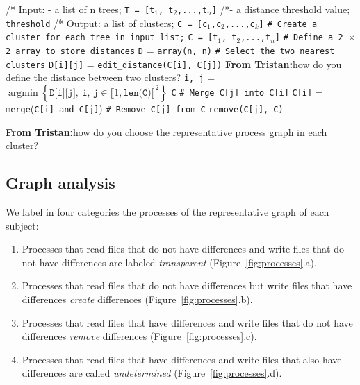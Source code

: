 \documentclass[a4paper,num-refs]{oup-contemporary}
\DeclareMathOperator*{\argmin}{argmin}
\newcommand{\tristan}[1]{\color{blue}\textbf{From Tristan:}#1\color{black}}
\begin{document}
\begin{algorithm}[h!]
\caption{Hierarchical clustering algorithm from SciPy}
\label{algo:hclustering}
\begin{algorithmic}

  \State /* Input: - a list of n trees; \texttt{T = [t${_1}$, t${_2}$,...,t${_n}$]}
  \State /*\quad \quad \quad \quad - a distance threshold value; \texttt{threshold}
  \State /* Output: a list of clusters; \texttt{C = [c${_1}$,c${_2}$,...,c${_k}$]}
  \State \texttt{\# Create a cluster for each tree in input list;}
  \State \texttt{C = [t${_1}$, t${_2}$,...,t${_n}$]}
  \State \texttt{\# Define a 2 $\times$ 2 array to store distances}
  \State \texttt{D} = \texttt{array(n, n)}
  \State \texttt{\# Select the two nearest clusters}
  \State \texttt{D[i][j]} = \texttt{edit\_distance(C[i], C[j])} \tristan{how do you define the distance between two clusters?}
    \EndFor
  \EndFor
  \State \texttt{i, j} = $\argmin \left\{ \texttt{D[i][j]}, \ \texttt{i, j} \in \llbracket 1, \texttt{len(C)}\rrbracket^2 \right\}$
  \State \Return \texttt{C}
  \Else
  \State \texttt{\# Merge C[j] into C[i]}
  \State \texttt{C[i]} = \texttt{merge}(\texttt{C[i] and C[j]})
  \State \texttt{\# Remove C[j] from C}
  \State \texttt{remove(C[j], C)}
  \EndIf
  \EndWhile
\end{algorithmic}
\end{algorithm}

\tristan{how do you choose the representative process graph in each cluster?}

\subsection{Graph analysis}

We label in four categories the processes of the representative graph of each subject:
\begin{enumerate}
\item Processes that read files that do not have differences and write files that do not have differences 
are labeled \emph{transparent} (Figure~\ref{fig:processes}.a).
\item Processes that read files 
that do not have differences but write files that have differences 
\emph{create} differences (Figure~\ref{fig:processes}.b).
\item Processes that read files 
that have differences and write files that do not have differences \emph{remove} 
differences (Figure~\ref{fig:processes}.c).
\item Processes that read files that have differences and write files that 
also have differences are called
\emph{undetermined} (Figure~\ref{fig:processes}.d).
\end{enumerate}
\end{document}
